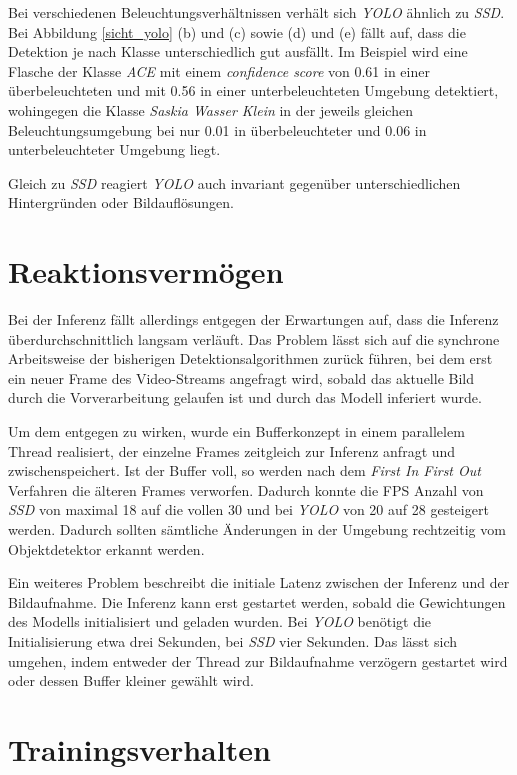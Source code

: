 Bei verschiedenen Beleuchtungsverhältnissen verhält sich \textit{YOLO} ähnlich zu \textit{SSD}. Bei Abbildung \ref{sicht_yolo} (b) und (c) sowie (d) und (e) fällt auf, dass die Detektion je nach Klasse unterschiedlich gut ausfällt. Im Beispiel wird eine Flasche der Klasse \textit{ACE} mit einem \textit{confidence score} von 0.61 in einer überbeleuchteten und mit 0.56 in einer unterbeleuchteten Umgebung detektiert, wohingegen die Klasse \textit{Saskia Wasser Klein} in der jeweils gleichen Beleuchtungsumgebung bei nur 0.01 in überbeleuchteter und 0.06 in unterbeleuchteter Umgebung liegt.

Gleich zu \textit{SSD} reagiert \textit{YOLO} auch invariant gegenüber unterschiedlichen Hintergründen oder Bildauflösungen.
 
\section{Reaktionsvermögen}

Bei der Inferenz fällt allerdings entgegen der Erwartungen auf, dass die Inferenz überdurchschnittlich langsam verläuft. Das Problem lässt sich auf die synchrone Arbeitsweise der bisherigen Detektionsalgorithmen zurück führen, bei dem erst ein neuer Frame des Video-Streams angefragt wird, sobald das aktuelle Bild durch die Vorverarbeitung gelaufen ist und durch das Modell inferiert wurde. 

Um dem entgegen zu wirken, wurde ein Bufferkonzept in einem parallelem Thread realisiert, der einzelne Frames zeitgleich zur Inferenz anfragt und zwischenspeichert. Ist der Buffer voll, so werden nach dem \textit{First In First Out} Verfahren die älteren Frames verworfen. Dadurch konnte die FPS Anzahl von \textit{SSD} von maximal 18 auf die vollen 30 und bei \textit{YOLO} von 20 auf 28 gesteigert werden. Dadurch sollten sämtliche Änderungen in der Umgebung rechtzeitig vom Objektdetektor erkannt werden. 

Ein weiteres Problem beschreibt die initiale Latenz zwischen der Inferenz und der Bildaufnahme. Die Inferenz kann erst gestartet werden, sobald die Gewichtungen des Modells initialisiert und geladen wurden. Bei \textit{YOLO} benötigt die Initialisierung etwa drei Sekunden, bei \textit{SSD} vier Sekunden. Das lässt sich umgehen, indem entweder der Thread zur Bildaufnahme verzögern gestartet wird oder dessen Buffer kleiner gewählt wird.

\section{Trainingsverhalten}

